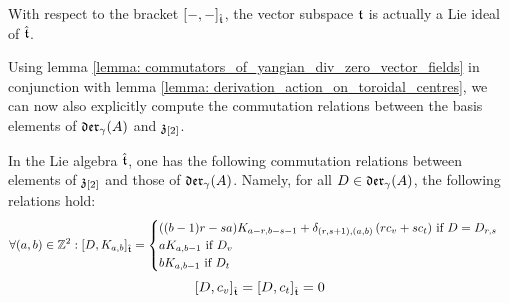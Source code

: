         \begin{corollary}
            With respect to the bracket $[-, -]_{\hat{\mathfrak{t}}}$, the vector subspace $\mathfrak{t}$ is actually a Lie ideal of $\hat{\mathfrak{t}}$.
        \end{corollary}
        Using lemma \ref{lemma: commutators_of_yangian_div_zero_vector_fields} in conjunction with lemma \ref{lemma: derivation_action_on_toroidal_centres}, we can now also explicitly compute the commutation relations between the basis elements of $\mathfrak{der}_{\gamma}(A)$ and $\mathfrak{z}_{[2]}$.
        \begin{lemma} \label{lemma: explicit_commutators_between_central_basis_elements_and_derivations}
            In the Lie algebra $\hat{\mathfrak{t}}$, one has the following commutation relations between elements of $\mathfrak{z}_{[2]}$ and those of $\mathfrak{der}_{\gamma}(A)$. Namely, for all $D \in \mathfrak{der}_{\gamma}(A)$, the following relations hold:
                $$
                    \forall (a, b) \in \mathbb{Z}^2: [D, K_{a, b}]_{\hat{\mathfrak{t}}} =
                    \begin{cases}
                        \text{$((b - 1)r - sa) K_{a - r, b - s - 1} + \delta_{(r, s + 1), (a, b)} \left( r c_v + s c_t \right)$ if $D = D_{r, s}$}
                        \\
                        \text{$a K_{a, b - 1}$ if $D_v$}
                        \\
                        \text{$b K_{a, b - 1}$ if $D_t$}
                    \end{cases}
                $$
                $$[D, c_v]_{\hat{\mathfrak{t}}} = [D, c_t]_{\hat{\mathfrak{t}}} = 0$$
        \end{lemma}
